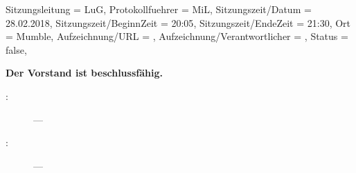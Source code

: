 \begin{Protokoll}{
		Sitzungsleitung                 = {LuG},             %
		Protokollfuehrer                = {MiL},              %
		Sitzungszeit/Datum              = {28.02.2018},       %
		Sitzungszeit/BeginnZeit         = {20:05},            %
		Sitzungszeit/EndeZeit           = {21:30},            %
		Ort                             = {Mumble},            %
		Aufzeichnung/URL                = {},                %
		Aufzeichnung/Verantwortlicher   = {},                  %
		Status                          = {false},            %
	}
	
	
	\begin{Anwesenheitsliste}
	\end{Anwesenheitsliste}
	
	\textbf{Der Vorstand ist beschlussfähig.}
	
	
	
	
	
	
	
	\begin{description}
		\item[:] ---
		\item[:] ---
        
        \newpage


\end{description}
\end{Protokoll}
